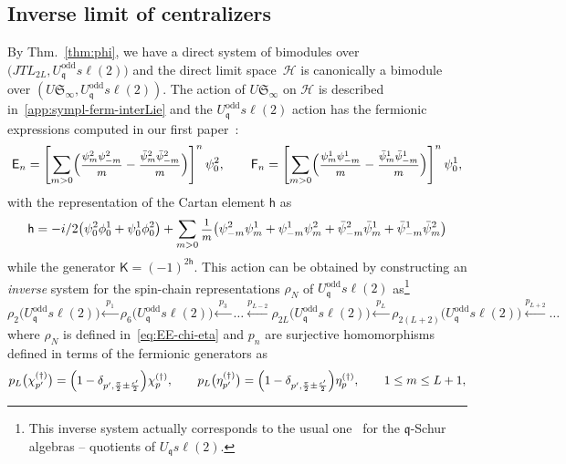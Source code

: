 \documentclass[11pt]{article}
\newcommand{\q}{\mathfrak{q}}
\newcommand{\ffrac}[2]{\mbox{\footnotesize$\displaystyle\frac{#1}{#2}$}}
\newcommand{\JTL}[1]{JTL_{#1}}
\newcommand{\LQG}{U_{\q} s\ell(2)}
\newcommand{\LQGodd}{U^{\text{odd}}_{\q} s\ell(2)}
\newcommand{\K}{\mathsf{K}}
\newcommand{\F}{\mathsf{F}}
\newcommand{\FF}[1]{\F_{#1}}
\newcommand{\E}{\mathsf{E}}
\newcommand{\EE}[1]{\E_{#1}}
\newcommand{\h}{\mathsf{h}}
\newcommand{\sfermp}{\psi^{2}}
\newcommand{\sfermm}{\psi^{1}}
\newcommand{\bsfermp}{\bar{\psi}^{2}}
\newcommand{\bsfermm}{\bar{\psi}^{1}}
\newcommand{\phip}{\phi^{2}}
\newcommand{\phim}{\phi^{1}}
\newcommand{\Hilb}{\mathcal{H}}
\newcommand{\step}{\epsilon}
\newcommand{\interLie}{\mathfrak{S}}
\newcommand{\interinfin}{\interLie_{\infty}}
\theoremstyle{definition}
\begin{document}
\newcommand{\rodd}{\rho\bigl(\LQGodd\bigr)}


\subsection{Inverse limit of centralizers}\label{app:inv-lim}
By Thm.~\ref{thm:phi}, we have a direct system of bimodules over $\bigl(\JTL{2L},\LQGodd\bigr)$ and the direct limit space~$\Hilb$ is canonically a bimodule over $(U\interinfin,\LQGodd)$.
The action of $U\interinfin$ on $\Hilb$ is described in~\eqref{app:sympl-ferm-interLie} and the $\LQGodd$ action has the fermionic expressions computed in our first paper~\cite{GRS1}:
\begin{equation}\label{app:EE-FF}
  \EE n =
\left[\sum_{m>0}
\Bigl(\ffrac{\sfermp_{m}\sfermp_{-m}}{m} -
\ffrac{\bsfermp_{m}\bsfermp_{-m}}{m}\Bigr)\right]^n\psi_0^2,\qquad
\FF n =
\left[\sum_{m>0}
\Bigl(\ffrac{\sfermm_{m}\sfermm_{-m}}{m} -
\ffrac{\bsfermm_{m}\bsfermm_{-m}}{m}\Bigr)\right]^n\psi_0^1,
\end{equation}
%
with the representation of the Cartan element $\h$ as
\begin{equation}\label{app:h}
\h =- i/2 \bigl(\sfermp_0\phim_0 + \sfermm_0\phip_0\bigr) + \sum_{m>0}
\ffrac{1}{m}\bigl(\sfermp_{-m}\sfermm_{m} + \sfermm_{-m}\sfermp_{m} + \bsfermp_{-m}\bsfermm_{m} + \bsfermm_{-m}\bsfermp_{m}\bigr)
\end{equation}
while the generator $\K = (-1)^{2\h}$.
This action can be obtained by constructing an {\sl inverse} system for the spin-chain representations $\rho_N$ of $\LQGodd$
as\footnote{This inverse system actually corresponds to the usual one~\cite{[Donk]} for the $\q$-Schur algebras -- quotients of  $\LQG$.}
\begin{equation}\label{QG-inverse}
\rho_2\bigl(\LQGodd\bigr)\xleftarrow{\;p_1\;}\rho_6\bigl(\LQGodd\bigr)\xleftarrow{\;p_3\;}\dots\xleftarrow{p_{L-2}}\rho_{2L}\bigl(\LQGodd\bigr)\xleftarrow{\;p_{L}\;}
\rho_{2(L+2)}\bigl(\LQGodd\bigr)\xleftarrow{p_{L+2}}\dots
\end{equation}
where $\rho_N$ is defined in~\eqref{eq:EE-chi-eta} and $p_n$ are surjective homomorphisms defined in terms of the fermionic generators as
\begin{equation}\label{eq:p-def}
p_L\bigl(\chi^{(\dagger)}_{p'}\bigr)=\Bigl(1-\delta_{p',\frac{\pi}{2}\pm\frac{\step'}{2}}\Bigr)\chi^{(\dagger)}_p,\qquad
p_L\bigl(\eta^{(\dagger)}_{p'}\bigr)=\Bigl(1-\delta_{p',\frac{\pi}{2}\pm\frac{\step'}{2}}\Bigr)\eta^{(\dagger)}_p,
\qquad 1\leq m\leq L+1,
\end{equation}
\end{document}
